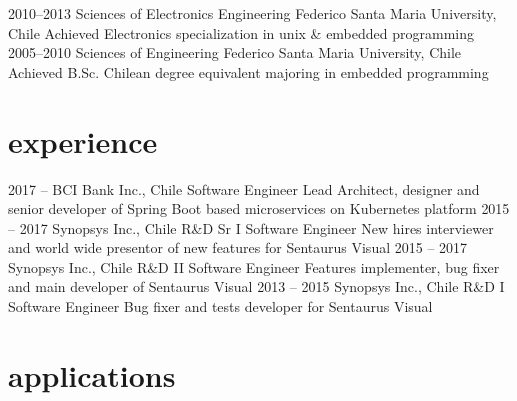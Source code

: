 \documentclass[]{friggeri-cv}
\begin{document}
\begin{entrylist}
  \entry
    {2010–2013}
    {Sciences of Electronics Engineering}
    {Federico Santa Maria University, Chile}
    {Achieved Electronics specialization in unix \& embedded programming}
  \entry
    {2005–2010}
    {Sciences of Engineering}
    {Federico Santa Maria University, Chile}
    {Achieved B.Sc. Chilean degree equivalent majoring in embedded programming
}
\end{entrylist}

\section{experience}

\begin{entrylist}
  \entry
    {2017 –}
    {BCI Bank Inc., Chile}
    {Software Engineer Lead}
    {Architect, designer and senior developer of Spring Boot based microservices on Kubernetes platform}
  \entry
    {2015 – 2017}
    {Synopsys Inc., Chile}
    {R\&D Sr I Software Engineer}
    {New hires interviewer and world wide presentor of new features for Sentaurus Visual}
  \entry
    {2015 – 2017}
    {Synopsys Inc., Chile}
    {R\&D II Software Engineer}
    {Features implementer, bug fixer and main developer of Sentaurus Visual}
  \entry
    {2013 – 2015}
    {Synopsys Inc., Chile}
    {R\&D I Software Engineer}
    {Bug fixer and tests developer for Sentaurus Visual}
\end{entrylist}

\newpage

\section{applications}
\end{document}
